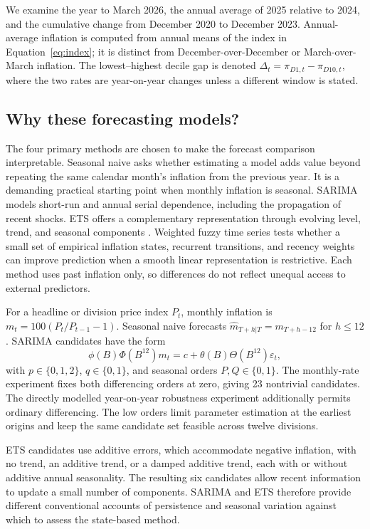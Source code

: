 \documentclass[11pt,a4paper]{article}
\begin{document}
We examine the year to March 2026, the annual average of 2025 relative to 2024, and the cumulative change from December 2020 to December 2023. Annual-average inflation is computed from annual means of the index in Equation~\eqref{eq:index}; it is distinct from December-over-December or March-over-March inflation. The lowest--highest decile gap is denoted $\Delta_t=\pi_{D1,t}-\pi_{D10,t}$, where the two rates are year-on-year changes unless a different window is stated.

\subsection{Why these forecasting models?}

The four primary methods are chosen to make the forecast comparison interpretable. Seasonal naive asks whether estimating a model adds value beyond repeating the same calendar month's inflation from the previous year. It is a demanding practical starting point when monthly inflation is seasonal. SARIMA models short-run and annual serial dependence, including the propagation of recent shocks. ETS offers a complementary representation through evolving level, trend, and seasonal components \citep{hyndman2021}. Weighted fuzzy time series tests whether a small set of empirical inflation states, recurrent transitions, and recency weights can improve prediction when a smooth linear representation is restrictive. Each method uses past inflation only, so differences do not reflect unequal access to external predictors.

For a headline or division price index $P_t$, monthly inflation is $m_t=100(P_t/P_{t-1}-1)$. Seasonal naive forecasts $\widehat m_{T+h|T}=m_{T+h-12}$ for $h\leq12$. SARIMA candidates have the form
\begin{equation}
 \phi(B)\Phi(B^{12})m_t
 =c+\theta(B)\Theta(B^{12})\varepsilon_t,
 \label{eq:sarima}
\end{equation}
with $p\in\{0,1,2\}$, $q\in\{0,1\}$, and seasonal orders $P,Q\in\{0,1\}$. The monthly-rate experiment fixes both differencing orders at zero, giving 23 nontrivial candidates. The directly modelled year-on-year robustness experiment additionally permits ordinary differencing. The low orders limit parameter estimation at the earliest origins and keep the same candidate set feasible across twelve divisions.

ETS candidates use additive errors, which accommodate negative inflation, with no trend, an additive trend, or a damped additive trend, each with or without additive annual seasonality. The resulting six candidates allow recent information to update a small number of components. SARIMA and ETS therefore provide different conventional accounts of persistence and seasonal variation against which to assess the state-based method.
\end{document}
